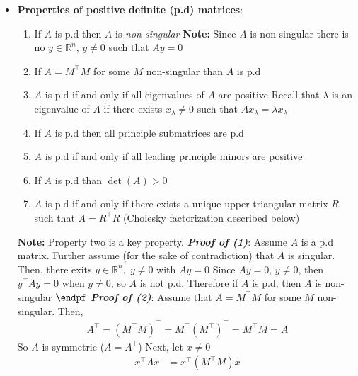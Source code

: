 \documentclass{report}
\begin{document}
\begin{itemize}
        \item \textbf{Properties of positive definite (p.d) matrices}:
            \begin{enumerate}
                \item If $A$ is p.d then $A$ is \textit{non-singular}
                    \bigbreak \noindent 
                    \textbf{Note:} Since $A$ is non-singular there is no $y \in \mathbb{R}^{n}$, $y\ne 0$ such that $Ay = 0$
                \item If $A = M^{\top}M$ for some $M$ non-singular than $A$ is p.d
                \item $A$ is p.d if and only if all eigenvalues of $A$ are positive
                    \bigbreak \noindent 
                    Recall that $\lambda$ is an eigenvalue of $A$ if there exists $x_{\lambda} \ne 0$ such that $Ax_{\lambda}  = \lambda x_{\lambda}$
                \item If $A$ is p.d then all principle submatrices are p.d
                \item $A$ is p.d if and only if all leading principle minors are positive
                \item If $A$ is p.d than $\det(A) > 0$
                \item $A$ is p.d if and only if there exists a unique upper triangular matrix $R$ such that $A = R^{\top}R$ (Cholesky factorization described below)
            \end{enumerate}
            \textbf{Note:} Property two is a key property.
            \bigbreak \noindent 
            \textbf{\textit{Proof of (1)}}: Assume $A$ is a p.d matrix. Further assume (for the sake of contradiction) that $A$ is singular. Then, there exits $y \in \mathbb{R}^{n},\; y \ne 0 $ with $Ay=0$
            \bigbreak \noindent 
            Since $Ay = 0$, $y\ne 0$, then $y^{\top}Ay=0$ when $y\ne 0$, so $A$ is not p.d.
            \bigbreak \noindent 
            Therefore if $A$ is p.d, then $A$ is non-singular $\endpf$
            \bigbreak \noindent 
            \textbf{\textit{Proof of (2)}}: Assume that $A  = M^{\top}M$ for some $M$ non-singular. Then,
            \begin{align*}
                A^{\top} = (M^{\top}M)^{\top} = M^{\top}(M^{\top})^{\top} = M^{\top}M = A
            \end{align*}
            So $A$ is symmetric ($A = A^{\top}$)
            \bigbreak \noindent 
            Next, let $x \ne 0$
            \begin{align*}
                x^{\top}Ax &= x^{\top}(M^{\top}M)x \\

\end{align*}
\end{itemize}
\end{document}
